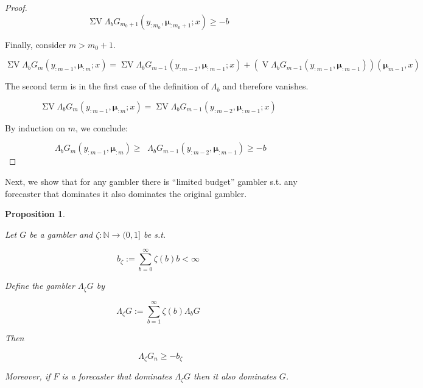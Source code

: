 \documentclass[11pt]{article}
\theoremstyle{definition}
\theoremstyle{plain}
\newtheorem{proposition}{Proposition}%
\newcommand{\Nats}{\mathbb{N}}
\DeclareMathOperator{\V}{V}
\DeclareMathOperator{\SV}{\Sigma V}
\DeclareMathOperator{\SVM}{\Sigma V_{\min}}
\newcommand{\Bd}{\Lambda}
\newcommand{\BM}{\bm{\mu}}
\begin{document}
\begin{proof}
$$\SV \Bd_b G_{m_0+1}\left(y_{:m_0},\BM_{:m_0+1};x\right) \geq -b$$

Finally, consider ${m > m_0 + 1}$.

$$\SV \Bd_b G_{m}\left(y_{:m-1},\BM_{:m};x\right) = \SV \Bd_b G_{m-1}\left(y_{:m-2},\BM_{:m-1};x\right) + \left(\V \Bd_b G_{m-1}\left(y_{:m-1},\BM_{:m-1}\right)\right)\left(\BM_{m-1},x\right)$$

The second term is in the first case of the definition of $\Bd_b$ and therefore vanishes.

$$\SV \Bd_b G_{m}\left(y_{:m-1},\BM_{:m};x\right) = \SV \Bd_b G_{m-1}\left(y_{:m-2},\BM_{:m-1};x\right)$$

By induction on ${m}$, we conclude:

$$\SVM \Bd_b G_{m}\left(y_{:m-1},\BM_{:m}\right) \geq \SVM \Bd_b G_{m-1}\left(y_{:m-2},\BM_{:m-1}\right) \geq -b$$
\end{proof}

Next, we show that for any gambler there is \enquote{limited budget} gambler s.t. any forecaster that dominates it also dominates the original gambler.

\begin{proposition}
\label{prp:frugal_gambler}

Let $G$ be a gambler and $\zeta: \Nats \rightarrow (0,1]$ be s.t.

\begin{equation}
b_\zeta := \sum_{b=0}^\infty \zeta\left(b\right) b < \infty
\end{equation}

Define the gambler $\Bd_\zeta G$ by

\begin{equation}
\Bd_\zeta G := \sum_{b = 1}^\infty \zeta\left(b\right) \Bd_b G
\end{equation}

Then

\begin{equation}
\label{eqn:prp_furgal_gambler__svm_b_zeta}
\SVM \Bd_\zeta G_n \geq -b_\zeta
\end{equation}

Moreover, if $F$ is a forecaster that dominates $\Bd_\zeta G$ then it also dominates $G$.

\end{proposition}
\end{document}
